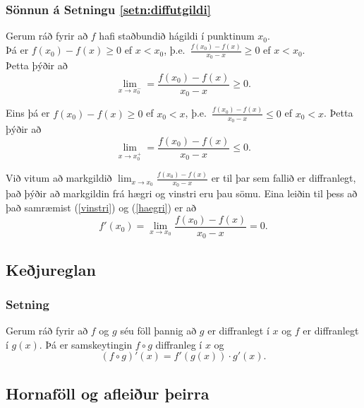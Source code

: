 \documentclass[icelandic,a4paper,12pt]{article}
\begin{document}
\subsubsection{Sönnun á Setningu \ref{setn:diffutgildi}}
Gerum ráð fyrir að $f$ hafi staðbundið hágildi í punktinum $x_0$. \\\pause
Þá er $f(x_0)-f(x)\geq 0$ ef $x<x_0$, þ.e.~$\frac{f(x_0)-f(x)}{x_0-x}\geq 0$
ef $x<x_0$. \\\pause 
Þetta þýðir að 
 \begin{equation}
	\lim_{x \to x_0^-} = \frac{f(x_0) - f(x)}{x_0-x} \geq 0.
	\label{vinstri}
 \end{equation}
 
\pause

Eins þá er $f(x_0)-f(x)\geq 0$ ef $x_0<x$, 
þ.e.~$\frac{f(x_0)-f(x)}{x_0-x} \leq 0$ ef $x_0 < x$. \pause 
Þetta þýðir að 
 \begin{equation}
	\lim_{x \to x_0^+} = \frac{f(x_0) - f(x)}{x_0-x} \leq 0.
	\label{haegri}
 \end{equation}
 
 \pause
 
 Við vitum að markgildið $\lim_{x\to x_0} \frac{f(x_0)-f(x)}{x_0-x}$ er
 til þar sem fallið er diffranlegt, það þýðir að markgildin frá hægri og
 vinstri eru þau sömu. \pause
 Eina leiðin til þess að það samræmist 
 (\ref{vinstri}) og (\ref{haegri}) er að 
 \begin{equation*}
	f'(x_0) = \lim_{x\to x_0} \frac{f(x_0)-f(x)}{x_0-x} = 0.
 \end{equation*}


\subsection{Keðjureglan}
\subsubsection{Setning}
Gerum ráð fyrir að $f$ og $g$ séu föll þannig að $g$ er diffranlegt í 
$x$ og  $f$ er diffranlegt í $g(x)$. Þá er samskeytingin $f\circ g$
diffranleg í $x$ og 
\begin{equation*}
	(f\circ g)'(x) = f'(g(x))\cdot g'(x).
\end{equation*}

\subsection{Hornaföll og afleiður þeirra}
\end{document}
